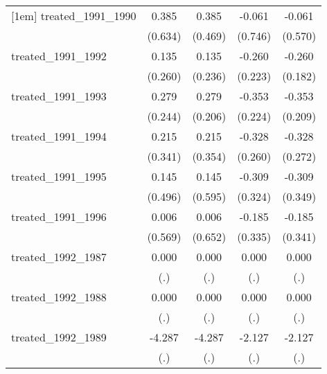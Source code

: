 {\begin{tabular}{l*{4}{c}}
[1em]
treated\_1991\_1990&       0.385         &       0.385         &      -0.061         &      -0.061         \\
            &     (0.634)         &     (0.469)         &     (0.746)         &     (0.570)         \\
[1em]
treated\_1991\_1992&       0.135         &       0.135         &      -0.260         &      -0.260         \\
            &     (0.260)         &     (0.236)         &     (0.223)         &     (0.182)         \\
[1em]
treated\_1991\_1993&       0.279         &       0.279         &      -0.353         &      -0.353         \\
            &     (0.244)         &     (0.206)         &     (0.224)         &     (0.209)         \\
[1em]
treated\_1991\_1994&       0.215         &       0.215         &      -0.328         &      -0.328         \\
            &     (0.341)         &     (0.354)         &     (0.260)         &     (0.272)         \\
[1em]
treated\_1991\_1995&       0.145         &       0.145         &      -0.309         &      -0.309         \\
            &     (0.496)         &     (0.595)         &     (0.324)         &     (0.349)         \\
[1em]
treated\_1991\_1996&       0.006         &       0.006         &      -0.185         &      -0.185         \\
            &     (0.569)         &     (0.652)         &     (0.335)         &     (0.341)         \\
[1em]
treated\_1992\_1987&       0.000         &       0.000         &       0.000         &       0.000         \\
            &         (.)         &         (.)         &         (.)         &         (.)         \\
[1em]
treated\_1992\_1988&       0.000         &       0.000         &       0.000         &       0.000         \\
            &         (.)         &         (.)         &         (.)         &         (.)         \\
[1em]
treated\_1992\_1989&      -4.287         &      -4.287         &      -2.127         &      -2.127         \\
            &         (.)         &         (.)         &         (.)         &         (.)         \\

\end{tabular}}
